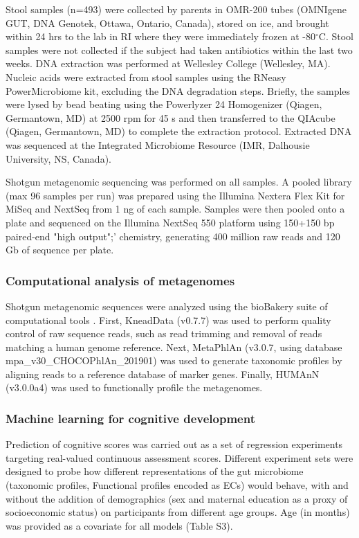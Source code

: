 \documentclass{article}
\begin{document}
Stool samples (n=493) were collected by parents in OMR-200 tubes
(OMNIgene GUT, DNA Genotek, Ottawa, Ontario, Canada), stored on ice, and
brought within 24 hrs to the lab in RI where they were immediately
frozen at -80$^{\circ}$C. Stool samples were not collected if the subject had
taken antibiotics within the last two weeks. DNA extraction was
performed at Wellesley College (Wellesley, MA). Nucleic acids were
extracted from stool samples using the RNeasy PowerMicrobiome kit,
excluding the DNA degradation steps. Briefly, the samples were lysed by
bead beating using the Powerlyzer 24 Homogenizer (Qiagen, Germantown,
MD) at 2500 rpm for 45 s and then transferred to the QIAcube (Qiagen,
Germantown, MD) to complete the extraction protocol. Extracted DNA was
sequenced at the Integrated Microbiome Resource (IMR, Dalhousie
University, NS, Canada).

Shotgun metagenomic sequencing was performed on all samples. A pooled
library (max 96 samples per run) was prepared using the Illumina Nextera
Flex Kit for MiSeq and NextSeq from 1 ng of each sample. Samples were
then pooled onto a plate and sequenced on the Illumina NextSeq 550
platform using 150+150 bp paired-end "high output";' chemistry,
generating 400 million raw reads and 120 Gb of sequence per plate.

\subsubsection*{Computational analysis of metagenomes}

Shotgun metagenomic sequences were analyzed using the bioBakery suite of
computational tools \cite{beghiniIntegratingTaxonomicFunctional2021}.
First, KneadData (v0.7.7) was used to perform quality
control of raw sequence reads, such as read trimming and removal of
reads matching a human genome reference. Next, MetaPhlAn (v3.0.7, using
database mpa\_v30\_CHOCOPhlAn\_201901) was used to generate taxonomic
profiles by aligning reads to a reference database of marker genes.
Finally, HUMAnN (v3.0.0a4) was used to functionally profile the
metagenomes.

\subsubsection*{Machine learning for cognitive development}

Prediction of cognitive scores was carried out as a set of regression
experiments targeting real-valued continuous assessment scores.
Different experiment sets were designed to probe how different
representations of the gut microbiome (taxonomic profiles, Functional
profiles encoded as ECs) would behave, with and without the addition of
demographics (sex and maternal education as a proxy of socioeconomic
status) on participants from different age groups. Age (in months) was
provided as a covariate for all models (Table S3).
\end{document}
